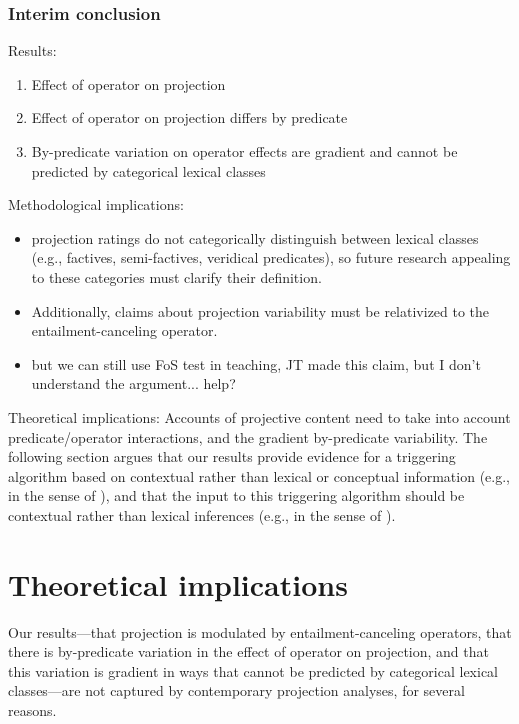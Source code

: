 \documentclass[a4paper,12pt,twoside]{article}
\begin{document}
	
		\subsubsection{Interim conclusion}

			Results:

			\begin{enumerate}
				\item Effect of operator on projection

				\item Effect of operator on projection differs by predicate

				\item By-predicate variation on operator effects are gradient and cannot be predicted by categorical lexical classes

			\end{enumerate}

			Methodological implications:
			\begin{itemize}
				\item projection ratings do not categorically distinguish between lexical classes (e.g., factives, semi-factives, veridical predicates), so future research appealing to these categories must clarify their definition.

				\item Additionally, claims about projection variability must be relativized to the entailment-canceling operator.

				\item but we can still use FoS test in teaching, JT made this claim, but I don't understand the argument... help?

			\end{itemize}

			Theoretical implications: Accounts of projective content need to take into account predicate/operator interactions, and the gradient by-predicate variability. The following section argues that our results provide evidence for a triggering algorithm based on contextual rather than lexical or conceptual information (e.g., in the sense of \citealt{abrusan_predicting_2011,simons_best_2017}), and that the input to this triggering algorithm should be contextual rather than lexical inferences (e.g., in the sense of \citealt{schlenker_triggering_2021}).


\section{Theoretical implications}
	Our results---that projection is modulated by entailment-canceling operators, that there is by-predicate variation in the effect of operator on projection, and that this variation is gradient in ways that cannot be predicted by categorical lexical classes---are not captured by contemporary projection analyses, for several reasons.
\end{document}
